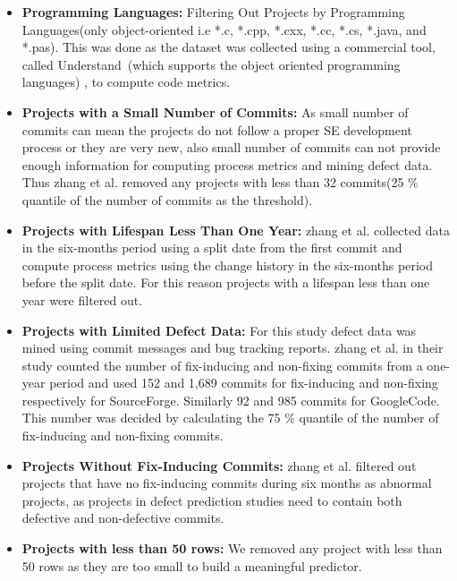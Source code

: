 \documentclass[sigconf,review]{acmart}
\newcommand{\bi}{\begin{itemize}[leftmargin=0.4cm]}
\newcommand{\ei}{\end{itemize}}
\theoremstyle{break}
\begin{document}
\bi

    \item \textbf{Programming Languages:} Filtering Out Projects by Programming Languages(only object-oriented i.e *.c, *.cpp, *.cxx, *.cc, *.cs, *.java, and *.pas). This was done as the dataset was collected using a commercial tool, called Understand~\cite{visualize}(which supports the object oriented programming languages) , to compute code metrics. 

    \item \textbf{Projects with a Small Number of Commits:} As small number of commits can mean the projects do not follow a proper SE development process or they are very new, also small number of commits can not provide enough information for computing process metrics and mining defect data. Thus zhang et al. removed any projects with less than 32 commits(25 \% quantile of the number of commits as the threshold).
    
    \item \textbf{Projects with Lifespan Less Than One Year:} zhang et al. collected data in the six-months period using a split date from the first commit and compute process metrics using the change history in the six-months period before the split date. For this reason projects with a lifespan less than one year were filtered out.
    
    \item \textbf{Projects with Limited Defect Data:} For this study defect data was mined using commit messages and bug tracking reports. zhang et al. in their study counted the number of fix-inducing and non-fixing commits from a one-year period and used 152 and 1,689 commits for fix-inducing and non-fixing  respectively for SourceForge. Similarly  92 and 985 commits for GoogleCode. This number was decided by calculating the 75 \% quantile of the number of fix-inducing and non-fixing commits.
    
    \item \textbf{Projects Without Fix-Inducing Commits:} zhang et al. filtered out projects that have no fix-inducing commits during six months as abnormal projects, as projects in defect prediction studies need to contain both defective and non-defective commits.
    
    \item \textbf{Projects with less than 50 rows:} We removed any project with less than 50 rows as they are too small to build a meaningful predictor. 

\ei
\end{document}
